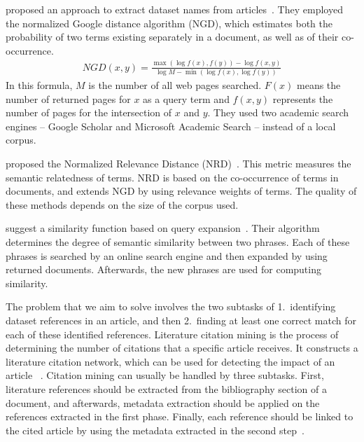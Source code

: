\documentclass{IOS-Book-Article}
\begin{document}
\citeauthor{sighal2013} proposed an approach to extract dataset names from articles~\cite{sighal2013}.
They employed the normalized Google distance algorithm (NGD), which estimates both the probability of two terms existing separately in a document, as well as of their co-occurrence. 
\begin{align*}
	\mathit{NGD}(x,y)=\frac{\max(\log f(x),f(y))-\log f(x,y)}{\log M -\min(\log f(x),\log f(y))}
\end{align*}
In this formula, $M$ is the number of all web pages searched.
$F(x)$ means the number of returned pages for $x$ as a query term and $f(x,y)$ represents the number of pages for the intersection of $x$ and $y$. 
They used two academic search engines -- Google Scholar and Microsoft Academic Search -- instead of a local corpus.

\citeauthor{Schaefer2014} proposed the Normalized Relevance Distance (NRD)~\cite{Schaefer2014}.
This metric measures the semantic relatedness of terms.
NRD is based on the co-occurrence of terms in documents, and extends NGD by using relevance weights of terms.
The quality of these methods depends on the size of the corpus used.

\citeauthor{Sahami2006} suggest a similarity function based on query expansion~\cite{Sahami2006}.
Their algorithm determines the degree of semantic similarity between two phrases.
Each of these phrases is searched by an online search engine and then expanded by using returned documents.
Afterwards, the new phrases are used for computing similarity. 

The problem that we aim to solve involves the two subtasks of 1.\ identifying dataset references in an article, and then 2.\ finding at least one correct match for each of these identified references.
Literature citation mining is the process of determining the number of citations that a specific article receives.
It constructs a literature citation network, which can be used for detecting the impact of an article~
\cite{Afzal2010}.
Citation mining can usually be handled by three subtasks.
First, literature references should be extracted from the bibliography section of a document, and afterwards, metadata extraction should be applied on the references extracted in the first phase.
Finally, each reference should be linked to the cited article by using the metadata extracted in the second step~\cite{Afzal2010}.
\end{document}
